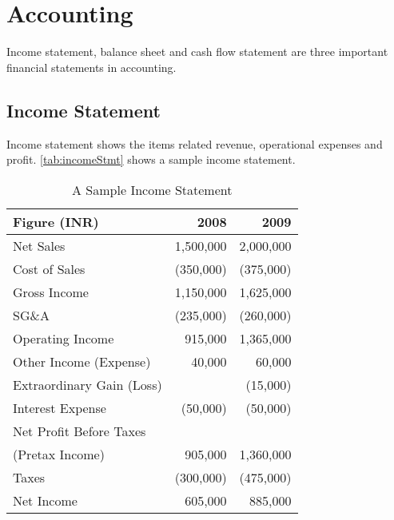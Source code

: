 \chapter{Accounting}
Income statement, balance sheet and cash flow statement are three important financial statements in accounting. 

\section{Income Statement}
Income statement shows the items related revenue, operational expenses and profit. \autoref{tab:incomeStmt} shows a sample income statement. 

	\begin{table}[h] \centering
		\begin{tabular}{l r r}
		\toprule
		Figure (INR)			& 2008 			& 2009 \\
		\midrule
		Net Sales			& 1,500,000		& 2,000,000	\\
		Cost of Sales		& (350,000)		& (375,000)	\\
		Gross Income		& 1,150,000		& 1,625,000 \\
		SG\&A				& (235,000)		& (260,000)	\\
		Operating Income	& 915,000		& 1,365,000	\\
		Other Income (Expense)		& 40,000		& 60,000   \\
		Extraordinary Gain (Loss)		& \textendash\ 	& (15,000) \\
		Interest Expense				& (50,000)		& (50,000) \\
		Net Profit Before Taxes\\(Pretax Income) 	& 905,000	& 1,360,000\\
		Taxes				& (300,000)		& (475,000) \\
		\midrule
		Net Income			& 605,000		& 885,000 \\
		\bottomrule
		\end{tabular}
	\caption{A Sample Income Statement}
	\label{tab:incomeStmt}
\end{table} 

